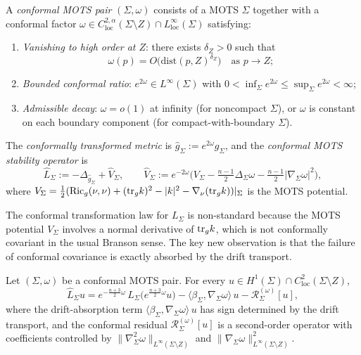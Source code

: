 \begin{definition}\label{def:ConformalMOTSPair}
A \emph{conformal MOTS pair} $(\Sigma,\omega)$ consists of a MOTS $\Sigma$ together with a conformal factor $\omega\in C^{2,\alpha}_{\mathrm{loc}}(\Sigma\setminus Z)\cap L^\infty_{\mathrm{loc}}(\Sigma)$ satisfying:
\begin{enumerate}
    \item \emph{Vanishing to high order at $Z$}: there exists $\delta_Z>0$ such that
    \[
        \omega(p)=O\bigl(\mathrm{dist}(p,Z)^{\delta_Z}\bigr)
        \quad\text{as }p\to Z;
    \]
    \item \emph{Bounded conformal ratio}: $e^{2\omega}\in L^\infty(\Sigma)$ with $0<\inf_\Sigma e^{2\omega}\le\sup_\Sigma e^{2\omega}<\infty$;
    \item \emph{Admissible decay}: $\omega=o(1)$ at infinity (for noncompact $\Sigma$), or $\omega$ is constant on each boundary component (for compact-with-boundary $\Sigma$).
\end{enumerate}
The \emph{conformally transformed metric} is $\hat g_\Sigma:=e^{2\omega}g_\Sigma$, and the \emph{conformal MOTS stability operator} is
\[
    \widehat L_\Sigma:=-\Delta_{\hat g_\Sigma}+\widehat V_\Sigma,
    \qquad
    \widehat V_\Sigma:=e^{-2\omega}\bigl(V_\Sigma-\tfrac{n-1}{2}\Delta_\Sigma\omega-\tfrac{n-1}{2}|\nabla_\Sigma\omega|^2\bigr),
\]
where $V_\Sigma=\tfrac12(\mathrm{Ric}_g(\nu,\nu)+(\mathrm{tr}_g k)^2-|k|^2-\nabla_\nu(\mathrm{tr}_g k))|_\Sigma$ is the MOTS potential.
\end{definition}

The conformal transformation law for $L_\Sigma$ is non-standard because the MOTS potential $V_\Sigma$ involves a normal derivative of $\mathrm{tr}_g k$, which is not conformally covariant in the usual Branson sense. The key new observation is that the failure of conformal covariance is exactly absorbed by the drift transport.

\begin{lemma}\label{lem:ConformalCovarianceDrift}
Let $(\Sigma,\omega)$ be a conformal MOTS pair. For every $u\in H^1(\Sigma)\cap C^2_{\mathrm{loc}}(\Sigma\setminus Z)$,
\begin{equation}\label{eq:ConformalCovarianceIdentity}
    \widehat L_\Sigma u
    =
    e^{-\frac{n+3}{2}\omega}\,L_\Sigma\bigl(e^{\frac{n+3}{2}\omega}u\bigr)
    -\langle\beta_\Sigma,\nabla_\Sigma\omega\rangle\,u
    -\mathcal R_\Sigma^{(\omega)}[u],
\end{equation}
where the drift-absorption term $\langle\beta_\Sigma,\nabla_\Sigma\omega\rangle\,u$ has sign determined by the drift transport, and the conformal residual $\mathcal R_\Sigma^{(\omega)}[u]$ is a second-order operator with coefficients controlled by $\|\nabla_\Sigma^2\omega\|_{L^\infty(\Sigma\setminus Z)}$ and $\|\nabla_\Sigma\omega\|_{L^\infty(\Sigma\setminus Z)}^2$.
\end{lemma}

